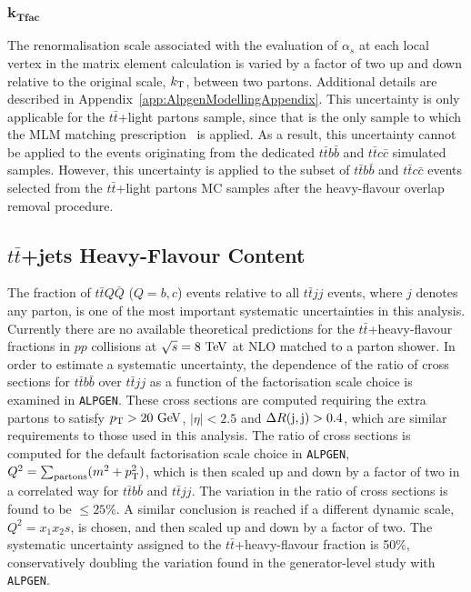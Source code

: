 \subsubsection*{$\mathbf{k_{Tfac}}$}
The renormalisation scale associated with the evaluation of $\alpha_s$ at each local
vertex in the matrix element calculation is varied by a factor of two
up and down relative to the original scale, $k_{\rm T}$, between two
partons.  
\ifIsINT 
Additional details are described in Appendix~\ref{app:AlpgenModellingAppendix}.
\fi 
This uncertainty is only applicable for the $t\bar{t}$+light partons
sample, since that is the only sample to which the MLM matching prescription~\cite{mlm} is
applied. As a result, this uncertainty cannot be applied to the events 
originating from the dedicated $t\bar{t}b\bar{b}$ and $t\bar{t}c\bar{c}$
simulated samples. However, this uncertainty is applied to the subset of $t\bar{t}b\bar{b}$ and $t\bar{t}c\bar{c}$
events selected from the $t\bar{t}$+light partons MC samples after the
heavy-flavour overlap removal procedure.


\subsection{$t\bar{t}$+jets Heavy-Flavour Content}
\label{sec:syst_ttbarHF}
The fraction of $t\bar{t}Q\bar{Q}$ ($Q=b,c$) events relative to all $t\bar{t}jj$ events, where $j$ denotes any parton,
is one of the most important systematic uncertainties in this analysis. 
Currently there are no available theoretical predictions for the $t\bar{t}$+heavy-flavour fractions in $pp$ collisions at $\sqrt{s}=8\tev$ at NLO matched to a parton shower.
In order to estimate a systematic uncertainty, the dependence of the ratio of cross sections for $t\bar{t}b\bar{b}$ over
$t\bar{t}jj$ as a function of the factorisation scale choice is examined in \texttt{ALPGEN}. These cross
sections are computed requiring the extra partons to satisfy $\pt>20\gev$, $|\eta|<2.5$ and $\Delta R({\rm j},{\rm j})>0.4$, which are similar requirements
to those used in this analysis. The ratio of cross sections is computed for the default factorisation scale choice
in \texttt{ALPGEN}, $Q^2=\sum_{\rm partons} (m^2 + \pt^2)$, which is then scaled up and down by a factor of two
in a correlated way for $t\bar{t}b\bar{b}$ and $t\bar{t}jj$.
The variation in the ratio of cross sections is found to be $\leq 25\%$. A similar conclusion is reached if a
different dynamic scale,  $Q^2=x_1 x_2 s$, is chosen, and then scaled up and down by a factor of two.
The systematic uncertainty assigned to the $t\bar{t}$+heavy-flavour fraction is 50\%, conservatively doubling
the variation found in the generator-level study with \texttt{ALPGEN}. 

